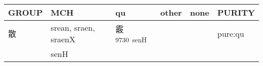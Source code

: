\documentclass[14pt,a4paper]{scrartcl}
\begin{document}
\begin{longtable}[c]{@{}llllll@{}}
\toprule
\begin{minipage}[b]{0.14\columnwidth}\raggedright\strut
GROUP
\strut\end{minipage} &
\begin{minipage}[b]{0.14\columnwidth}\raggedright\strut
MCH
\strut\end{minipage} &
\begin{minipage}[b]{0.14\columnwidth}\raggedright\strut
qu
\strut\end{minipage} &
\begin{minipage}[b]{0.14\columnwidth}\raggedright\strut
other
\strut\end{minipage} &
\begin{minipage}[b]{0.14\columnwidth}\raggedright\strut
none
\strut\end{minipage} &
\begin{minipage}[b]{0.14\columnwidth}\raggedright\strut
PURITY
\strut\end{minipage}\tabularnewline
\midrule
\endhead
\begin{minipage}[t]{0.14\columnwidth}\raggedright\strut
散
\strut\end{minipage} &
\begin{minipage}[t]{0.14\columnwidth}\raggedright\strut
srean, sraen, sraenX
\strut\end{minipage} &
\begin{minipage}[t]{0.14\columnwidth}\raggedright\strut
霰\textsuperscript{9730~senH}
\strut\end{minipage} &
\begin{minipage}[t]{0.14\columnwidth}\raggedright\strut
\strut\end{minipage} &
\begin{minipage}[t]{0.14\columnwidth}\raggedright\strut
\strut\end{minipage} &
\begin{minipage}[t]{0.14\columnwidth}\raggedright\strut
pure:qu
\strut\end{minipage}\tabularnewline
\begin{minipage}[t]{0.14\columnwidth}\raggedright\strut
𢿱
\strut\end{minipage} &
\begin{minipage}[t]{0.14\columnwidth}\raggedright\strut
senH
\strut\end{minipage} &
\begin{minipage}[t]{0.14\columnwidth}\raggedright\strut
\strut\end{minipage} &

\end{longtable}
\end{document}
